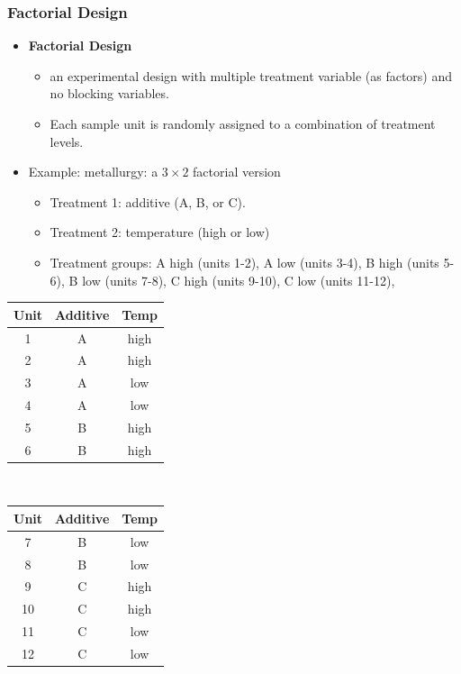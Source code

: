 \documentclass[handout]{beamer}
\numberwithin{equation}{section}
\begin{document}
\begin{frame}
\frametitle{Factorial Design} \small

\begin{itemize}
\item {\bf Factorial Design} 
\begin{itemize}
\pause \item an experimental design with multiple treatment variable (as factors) and no blocking variables.
\pause \item Each sample unit is randomly assigned to a combination of treatment levels.
\end{itemize} 
\pause \item Example: metallurgy: a $3 \times 2$ factorial version
\begin{itemize}
\pause \item Treatment 1: additive (A, B, or C).
\pause \item Treatment 2: temperature (high or low)
\pause \item Treatment groups: A high (units 1-2), A low (units 3-4), B high (units 5-6), B low (units 7-8), C high (units 9-10), C low (units 11-12), 
\end{itemize} 
\end{itemize}
\scriptsize
\begin{center}
\begin{tabular}{c|c|c}
Unit & Additive & Temp \\ \hline
1 & A & high \\ 
2 & A & high \\ 
3 & A & low \\ 
4 & A & low \\ 
5 & B & high \\ 
6 & B & high\\ 
\end{tabular}$\quad$ \begin{tabular}{c|c|c}
Unit & Additive & Temp \\ \hline
7 & B & low \\ 
8 & B & low \\ 
9 & C & high \\ 
10 & C & high \\ 
11 & C & low \\ 
12 & C & low \\ 
\end{tabular}
\end{center}
\end{frame}
\end{document}
